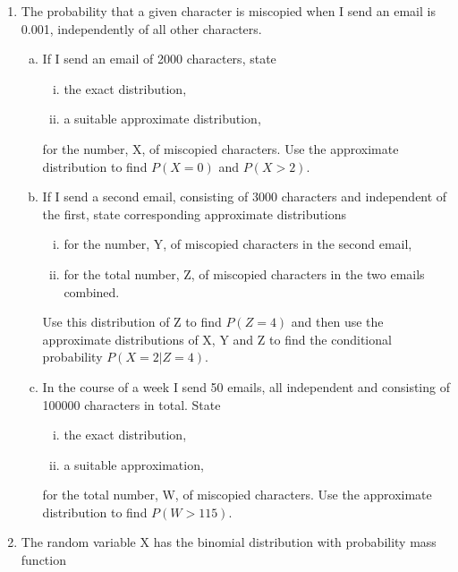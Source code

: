 \documentclass[a4paper,12pt]{article}
\begin{document}

\begin{enumerate}
\item The probability that a given character is miscopied when I send an email is 0.001, independently of all other characters.
\begin{enumerate}[(a)]
\item If I send an email of 2000 characters, state
\begin{enumerate}[(i)]
\item  the exact distribution,
\item a suitable approximate distribution,
\end{enumerate}
for the number, X, of miscopied characters. Use the approximate distribution to find $P(X = 0)$ and $P(X > 2)$.

\item If I send a second email, consisting of 3000 characters and independent of the first, state corresponding approximate distributions
\begin{enumerate}[(i)]
\item for the number, Y, of miscopied characters in the second email,
\item for the total number, Z, of miscopied characters in the two emails combined.
\end{enumerate}
Use this distribution of Z to find $P(Z = 4)$ and then use the approximate distributions of X, Y and Z to find the conditional probability $P(X = 2 | Z = 4)$.

\item In the course of a week I send 50 emails, all independent and consisting of 100000 characters in total. State
\begin{enumerate}[(i)]
\item the exact distribution,
\item a suitable approximation,
\end{enumerate}
for the total number, W, of miscopied characters. Use the approximate distribution to find $P(W > 115)$.

\end{enumerate}
\item The random variable X has the binomial distribution with probability mass function


\end{enumerate}
\end{document}
